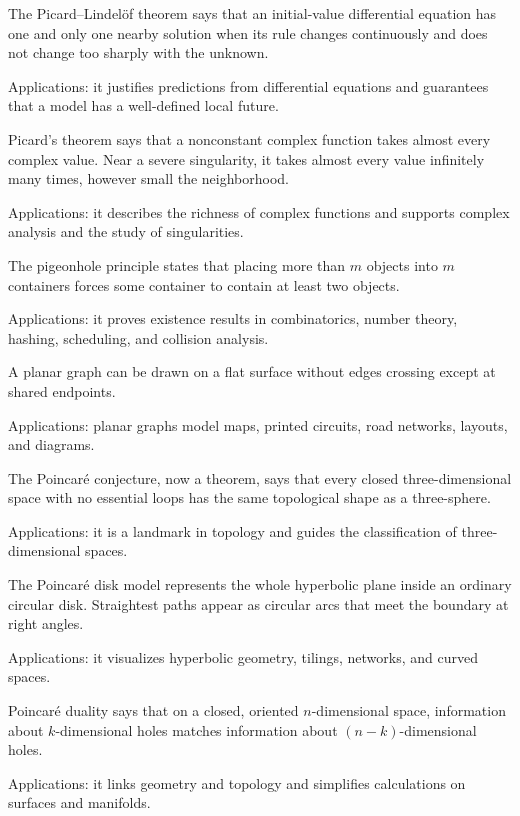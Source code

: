 The Picard--Lindelöf theorem says that an initial-value differential equation has one and only one nearby solution when its rule changes continuously and does not change too sharply with the unknown. \par\noindent Applications: it justifies predictions from differential equations and guarantees that a model has a well-defined local future.

Picard's theorem says that a nonconstant complex function takes almost every complex value. Near a severe singularity, it takes almost every value infinitely many times, however small the neighborhood. \par\noindent Applications: it describes the richness of complex functions and supports complex analysis and the study of singularities.

The pigeonhole principle states that placing more than $m$ objects into $m$ containers forces some container to contain at least two objects. \par\noindent Applications: it proves existence results in combinatorics, number theory, hashing, scheduling, and collision analysis.

A planar graph can be drawn on a flat surface without edges crossing except at shared endpoints. \par\noindent Applications: planar graphs model maps, printed circuits, road networks, layouts, and diagrams.

The Poincaré conjecture, now a theorem, says that every closed three-dimensional space with no essential loops has the same topological shape as a three-sphere. \par\noindent Applications: it is a landmark in topology and guides the classification of three-dimensional spaces.

The Poincaré disk model represents the whole hyperbolic plane inside an ordinary circular disk. Straightest paths appear as circular arcs that meet the boundary at right angles. \par\noindent Applications: it visualizes hyperbolic geometry, tilings, networks, and curved spaces.

Poincaré duality says that on a closed, oriented $n$-dimensional space, information about $k$-dimensional holes matches information about $(n-k)$-dimensional holes. \par\noindent Applications: it links geometry and topology and simplifies calculations on surfaces and manifolds.

